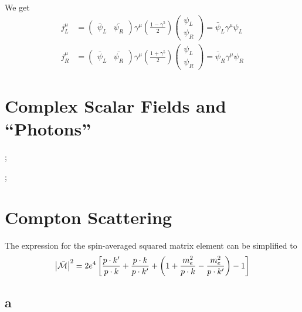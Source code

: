 \documentclass[11pt, a4paper]{amsart}
\begin{document}
We get
\begin{align}
j_L^\mu &= \begin{pmatrix}
\bar{\psi}_L & \bar{\psi_R}
\end{pmatrix}\gamma^\mu \left(\frac{1 - \gamma^5}{2}\right) 
\begin{pmatrix}
\psi_L \\
\psi_R
\end{pmatrix} = \bar{\psi}_L \gamma^\mu \psi_L \\
j_R^\mu &= \begin{pmatrix}
\bar{\psi}_L & \bar{\psi_R}
\end{pmatrix}\gamma^\mu \left(\frac{1 + \gamma^5}{2}\right) 
\begin{pmatrix}
\psi_L \\
\psi_R
\end{pmatrix} = \bar{\psi}_R \gamma^\mu \psi_R
\end{align}


\section{Complex Scalar Fields and ``Photons''}


;

;





\section{Compton Scattering}
The expression for the spin-averaged squared matrix element can be simplified to
\begin{equation}
\abs{\bar{\mathcal{M}}}^2 = 2e^4 \left[\frac{p\cdot k'}{p\cdot k} + \frac{p \cdot k}{p \cdot k'} + \left(1 + \frac{m_e^2}{p\cdot k} - \frac{m_e^2}{p\cdot k'} \right) - 1 \right]
\end{equation}

\subsection{a}
\end{document}
